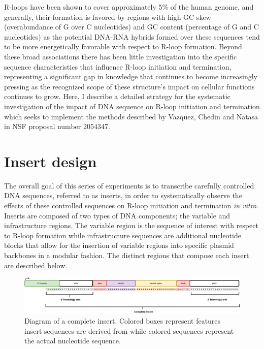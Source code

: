 \documentclass[11pt]{article}
\begin{document}
R-loops have been shown to cover approximately 5\% of the human genome, and generally, their formation is favored by regions with high GC skew (overabundance of G over C nucleotides) and GC content (percentage of G and C nucleotides) as the potential DNA-RNA hybrids formed over these sequences tend to be more energetically favorable with respect to R-loop formation\cite{Stolz2019}. Beyond these broad associations there has been little investigation into the specific sequence characteristics that influence R-loop initiation and termination, representing a significant gap in knowledge that continues to become increasingly pressing as the recognized scope of these structure's impact on cellular functions continues to grow. Here, I describe a detailed strategy for the systematic investigation of the impact of DNA sequence on R-loop initiation and termination which seeks to implement the methods described by Vazquez, Chedin and Natasa in NSF proposal number 2054347. 


\section{Insert design}

The overall goal of this series of experiments is to transcribe carefully controlled DNA sequences, referred to as inserts, in order to systematically observe the effects of these controlled sequences on R-loop initiation and termination \emph{in vitro}. Inserts are composed of two types of DNA components; the variable and infrastructure regions. The variable region is the sequence of interest with respect to R-loop formation while infrastructure sequences are additional nucleotide blocks that allow for the insertion of variable regions into specific plasmid backbones in a modular fashion. The distinct regions that compose each insert are described below. 

\begin{figure}[H]
	\includegraphics[width=16cm]{images/variable_region/construct_diagrams-Detailed-Insert.png}
	\centering
	\caption{Diagram of a complete insert. Colored boxes represent features insert sequences are derived from while colored sequences represent the actual nucleotide sequence.}
	\label{figure:1}
\end{figure}
\end{document}
